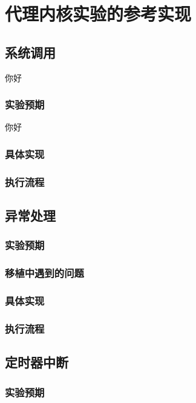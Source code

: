 \chapter{代理内核实验的参考实现}

\section{系统调用}
你好
\subsection{实验预期}
你好
\subsection{具体实现}

\subsection{执行流程}

\section{异常处理}

\subsection{实验预期}

\subsection{移植中遇到的问题}

\subsection{具体实现}

\subsection{执行流程}

\section{定时器中断}

\subsection{实验预期}

